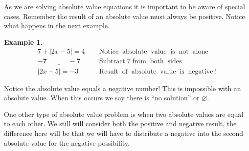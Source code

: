 \documentclass[12pt]{book}
\theoremstyle{definition}
\newtheorem{example}{Example}
\newcommand{\tmmathbf}[1]{\ensuremath{\boldsymbol{#1}}}
\newcommand{\tmop}[1]{\ensuremath{\operatorname{#1}}}
\begin{document}
As we are solving absolute value equations it is important to be aware of special cases. Remember the result of an absolute value must always be positive. Notice what happens in the next example.
\begin{example}\label{Lin40}
  \begin{eqnarray*}
    7 + |2x - 5| = 4~ &  & \tmop{Notice} \tmop{absolute} \tmop{value} \tmop{is}
    \tmop{not} \tmop{alone}\\
    \underline{\tmmathbf{- 7 ~~~~~~~~~~~~~~- 7}} &  & \tmop{Subtract} 7 \tmop{from}
    \tmop{both} \tmop{sides}\\
    |2x - 5| = - 3~~ &  & \tmop{Result} \tmop{of} \tmop{absolute} \tmop{value}
    \tmop{is} \tmop{negative} !
  \end{eqnarray*}
\end{example}
Notice the absolute value equals a negative number! This is impossible with an absolute value. When this occurs we say there is ``no solution'' or $\varnothing$.\par
One other type of absolute value problem is when two absolute values are equal to each other. We still will consider both the positive and negative result, the difference here will be that we will have to distribute a negative into the second absolute value for the negative possibility.
\end{document}
